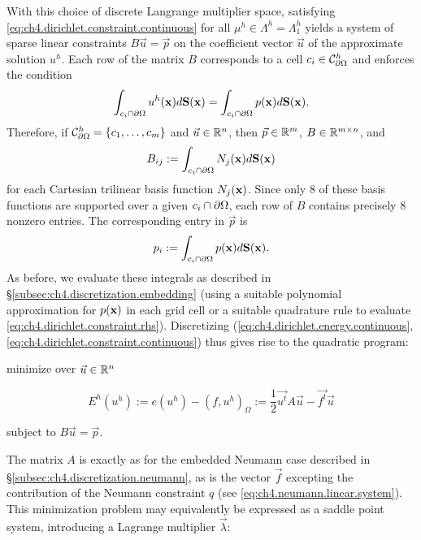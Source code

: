 With this choice of discrete Langrange multiplier space, satisfying \eqref{eq:ch4.dirichlet.constraint.continuous} for all $\mu^h \in \Lambda^h = \Lambda^h_1$ yields a system of sparse linear constraints $B \vec{u} = \vec{p}$ on the coefficient vector $\vec{u}$ of the approximate solution $u^h$. Each row of the matrix $B$ corresponds to a cell $c_i \in \mathcal{C}^{h}_{\partial\Omega}$ and enforces the condition
\begin{equation} \label{eq:ch4.dirichlet.constraint.discrete}
\int_{c_i \cap \partial\Omega} u^h(\mathbf{x}) d\mathbf{S}(\mathbf{x}) = \int_{c_i \cap \partial\Omega} p(\mathbf{x}) d\mathbf{S}(\mathbf{x}).
\end{equation}
Therefore, if $\mathcal{C}^h_{\partial\Omega} = \left\lbrace  c_1, \dotsc, c_m  \right\rbrace$ and $\vec{u} \in \mathbb{R}^n$, then $\vec{p} \in \mathbb{R}^m$, $B \in \mathbb{R}^{m \times n}$, and
\begin{equation} \label{eq:ch4.dirichlet.constraint.matrix}
B_{ij} := \int_{c_i \cap \partial\Omega} N_j(\mathbf{x}) d\mathbf{S}(\mathbf{x})
\end{equation}
for each Cartesian trilinear basis function $N_j(\mathbf{x})$. Since only $8$ of these basis functions are supported over a given $c_i \cap \partial\Omega$, each row of $B$ contains precisely $8$ nonzero entries. The corresponding entry in $\vec{p}$ is
\begin{equation} \label{eq:ch4.dirichlet.constraint.rhs}
p_i := \int_{c_i \cap \partial\Omega} p(\mathbf{x}) d\mathbf{S}(\mathbf{x}).
\end{equation}
As before, we evaluate these integrals as described in \S\ref{subsec:ch4.discretization.embedding} (using a suitable polynomial approximation for $p(\mathbf{x})$ in each grid cell or a suitable quadrature rule to evaluate \eqref{eq:ch4.dirichlet.constraint.rhs}). Discretizing (\ref{eq:ch4.dirichlet.energy.continuous}, \ref{eq:ch4.dirichlet.constraint.continuous}) thus gives rise to the quadratic program:
\begin{center}
minimize over $\vec{u} \in \mathbb{R}^n$
\end{center}
\begin{equation} \label{eq:ch4.quadraticminimization.discrete}
E^h(u^h) := e(u^h) - (f, u^h)_{\Omega} := \frac{1}{2} \vec{u^t} A \vec{u} - \vec{f^t} \vec{u}
\end{equation}
\begin{center}
subject to $B \vec{u} = \vec{p}$.
\end{center}
The matrix $A$ is exactly as for the embedded Neumann case described in \S\ref{subsec:ch4.discretization.neumann}, as is the vector $\vec{f}$ excepting the contribution of the Neumann constraint $q$ (see \eqref{eq:ch4.neumann.linear.system}). This minimization problem may equivalently be expressed as a saddle point system, introducing a Lagrange multiplier $\vec{\lambda}$:
